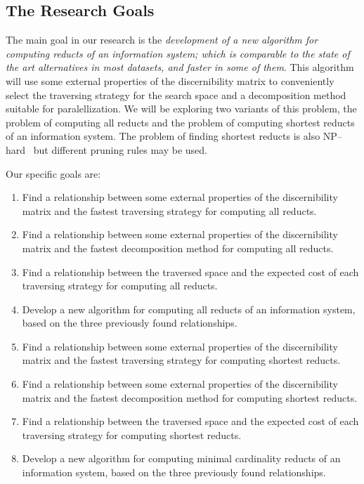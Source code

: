 \documentclass[authoryear,11pt]{elsarticle}
\begin{document}
\subsection{The Research Goals}\label{Goals} 
  The main goal in our research is the \emph{development of  a new algorithm for computing reducts of an 
  information system; which is comparable to the state of the art alternatives 
  in most datasets, and faster in some of them}. This algorithm will use some external properties of the
  discernibility matrix to conveniently select the traversing strategy for the search space and a 
  decomposition method suitable for paralellization. We will be exploring two variants of this problem,
  the problem of computing all reducts and the problem of computing shortest reducts of an information system.
  The problem of finding shortest reducts is also NP--hard~\citep{Lin04} but different pruning rules may
  be used.
  
  Our specific goals are:
  \begin{enumerate}
  \item Find a relationship between some external properties of the discernibility matrix and the fastest 
  		traversing strategy for computing all reducts.
  		  	
  \item Find a relationship between some external properties of the discernibility matrix and the fastest 
  		decomposition method for computing all reducts.
  		
  \item Find a relationship between the traversed space and the expected cost of each traversing strategy
  		for computing all reducts.
  
  \item Develop a new algorithm for computing all reducts of an information system, based 
  		on the three previously found relationships.
  		
  \item Find a relationship between some external properties of the discernibility matrix and the fastest 
  		traversing strategy for computing shortest reducts.
  		  	
  \item Find a relationship between some external properties of the discernibility matrix and the fastest 
  		decomposition method for computing shortest reducts.
  		
  \item Find a relationship between the traversed space and the expected cost of each traversing strategy
  		for computing shortest reducts.
  
  \item Develop a new algorithm for computing minimal cardinality reducts of an information system, based 
  		on the three previously found relationships.

  \end{enumerate}
\end{document}
